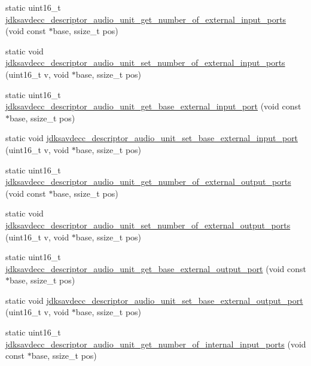 \begin{DoxyCompactItemize}
static uint16\+\_\+t \hyperlink{group__descriptor__audio_gafd249e4d2a03beb274250b75e9f6b2ef}{jdksavdecc\+\_\+descriptor\+\_\+audio\+\_\+unit\+\_\+get\+\_\+number\+\_\+of\+\_\+external\+\_\+input\+\_\+ports} (void const $\ast$base, ssize\+\_\+t pos)
\item 
static void \hyperlink{group__descriptor__audio_ga9ffbf27d33e75a2ccf92bae1d505335e}{jdksavdecc\+\_\+descriptor\+\_\+audio\+\_\+unit\+\_\+set\+\_\+number\+\_\+of\+\_\+external\+\_\+input\+\_\+ports} (uint16\+\_\+t v, void $\ast$base, ssize\+\_\+t pos)
\item 
static uint16\+\_\+t \hyperlink{group__descriptor__audio_gaf59ae0e612901bfe1b2c7d1ff8f9a072}{jdksavdecc\+\_\+descriptor\+\_\+audio\+\_\+unit\+\_\+get\+\_\+base\+\_\+external\+\_\+input\+\_\+port} (void const $\ast$base, ssize\+\_\+t pos)
\item 
static void \hyperlink{group__descriptor__audio_ga6805ff2e94192884b3f7398701f85db2}{jdksavdecc\+\_\+descriptor\+\_\+audio\+\_\+unit\+\_\+set\+\_\+base\+\_\+external\+\_\+input\+\_\+port} (uint16\+\_\+t v, void $\ast$base, ssize\+\_\+t pos)
\item 
static uint16\+\_\+t \hyperlink{group__descriptor__audio_ga6abf5fd015a87121a7a06af5b7dd4cf3}{jdksavdecc\+\_\+descriptor\+\_\+audio\+\_\+unit\+\_\+get\+\_\+number\+\_\+of\+\_\+external\+\_\+output\+\_\+ports} (void const $\ast$base, ssize\+\_\+t pos)
\item 
static void \hyperlink{group__descriptor__audio_gaa8e789eb58ac6e888e94a01a57d8fa05}{jdksavdecc\+\_\+descriptor\+\_\+audio\+\_\+unit\+\_\+set\+\_\+number\+\_\+of\+\_\+external\+\_\+output\+\_\+ports} (uint16\+\_\+t v, void $\ast$base, ssize\+\_\+t pos)
\item 
static uint16\+\_\+t \hyperlink{group__descriptor__audio_ga918686b5830f24704cfa3e8669256ec6}{jdksavdecc\+\_\+descriptor\+\_\+audio\+\_\+unit\+\_\+get\+\_\+base\+\_\+external\+\_\+output\+\_\+port} (void const $\ast$base, ssize\+\_\+t pos)
\item 
static void \hyperlink{group__descriptor__audio_ga4f4378c7c69e72d3670ba5f58c8a3e43}{jdksavdecc\+\_\+descriptor\+\_\+audio\+\_\+unit\+\_\+set\+\_\+base\+\_\+external\+\_\+output\+\_\+port} (uint16\+\_\+t v, void $\ast$base, ssize\+\_\+t pos)
\item 
static uint16\+\_\+t \hyperlink{group__descriptor__audio_ga3cd9996d50664f9501fba6dff2835b57}{jdksavdecc\+\_\+descriptor\+\_\+audio\+\_\+unit\+\_\+get\+\_\+number\+\_\+of\+\_\+internal\+\_\+input\+\_\+ports} (void const $\ast$base, ssize\+\_\+t pos)
\item 

\end{DoxyCompactItemize}
